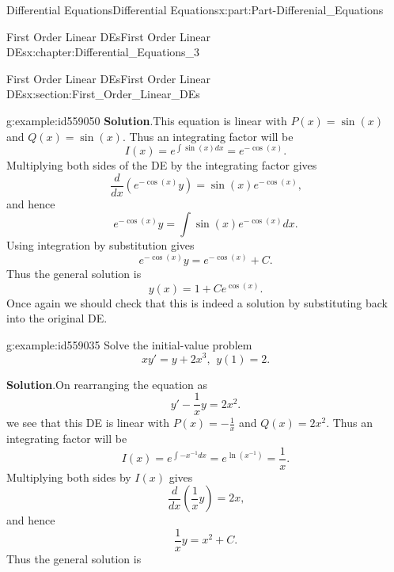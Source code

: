 \documentclass[oneside,10pt,]{book}
\newcommand{\blocktitlefont}{\relax}
\numberwithin{equation}{section}
\begin{document}
\begin{partptx}{Differential Equations}{}{Differential Equations}{}{}{x:part:Part-Differenial_Equations}
\begin{chapterptx}{First Order Linear DEs}{}{First Order Linear DEs}{}{}{x:chapter:Differential_Equations_3}
\begin{sectionptx}{First Order Linear DEs}{}{First Order Linear DEs}{}{}{x:section:First_Order_Linear_DEs}
\begin{example}{}{g:example:id559050}
\noindent\textbf{\blocktitlefont Solution}.\hypertarget{g:solution:id559024}{}\quad{}This equation is linear with \(P(x) = \sin(x)\) and \(Q(x) = \sin(x)\). Thus an integrating factor will be%
\begin{equation*}
I(x) = e^{\int \sin(x) dx} = e^{-\cos(x)}\text{.}
\end{equation*}
Multiplying both sides of the DE by the integrating factor gives%
\begin{equation*}
\dfrac{d}{dx} \left( e^{-\cos(x)}y \right) = \sin(x) e^{-\cos(x)}\text{,}
\end{equation*}
and hence%
\begin{equation*}
e^{-\cos(x)} y = \int \sin(x) e^{-\cos(x)} dx\text{.}
\end{equation*}
Using integration by substitution gives%
\begin{equation*}
e^{-\cos(x)}y = e^{-\cos(x)} + C\text{.}
\end{equation*}
Thus the general solution is%
\begin{equation*}
y(x) = 1+C e^{\cos(x)}\text{.}
\end{equation*}
Once again we should check that this is indeed a solution by substituting back into the original DE.%
\end{example}
\begin{example}{}{g:example:id559035}%
Solve the initial-value problem%
\begin{equation*}
xy' = y + 2x^3, \: \, y(1) = 2\text{.}
\end{equation*}
%
\par\smallskip%
\noindent\textbf{\blocktitlefont Solution}.\hypertarget{g:solution:id559074}{}\quad{}On rearranging the equation as%
\begin{equation*}
y' - \frac{1}{x} y = 2x^2\text{.}
\end{equation*}
we see that this DE is linear with \(P(x) = -\frac{1}{x}\) and \(Q(x) = 2x^2\). Thus an integrating factor will be%
\begin{equation*}
I(x) = e^{\int -x^{-1} dx} = e^{\ln (x^{-1})} = \frac{1}{x}\text{.}
\end{equation*}
Multiplying both sides by \(I(x)\) gives%
\begin{equation*}
\dfrac{d}{dx} \left( \dfrac{1}{x} y \right) = 2x\text{,}
\end{equation*}
and hence%
\begin{equation*}
\dfrac{1}{x} y = x^2 + C\text{.}
\end{equation*}
Thus the general solution is%

\end{example}
\end{sectionptx}
\end{chapterptx}
\end{partptx}
\end{document}
